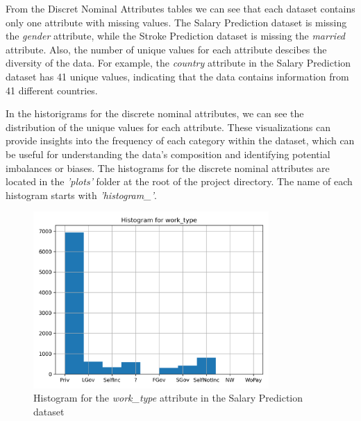 \documentclass[runningheads]{paper}
\begin{document}
From the Discret Nominal Attributes tables we can see that each dataset contains
only one attribute with missing values. The Salary Prediction dataset is missing
the \textit{gender} attribute, while the Stroke Prediction dataset is missing the
\textit{married} attribute. Also, the number of unique values for each attribute
descibes the diversity of the data. For example, the \textit{country} attribute
in the Salary Prediction dataset has 41 unique values, indicating that the data
contains information from 41 different countries.

In the historigrams for the discrete nominal attributes, we can see the
distribution of the unique values for each attribute. These visualizations can
provide insights into the frequency of each category within the dataset, which
can be useful for understanding the data's composition and identifying potential
imbalances or biases. The histograms for the discrete nominal attributes are
located in the \textit{'plots'} folder at the root of the project directory.
The name of each histogram starts with \textit{'histogram\_'}.

\begin{figure}[H]
    \centering
    \includegraphics[width=0.8\textwidth]{../plots/histogram_work_type_SalaryPrediction_full.png}
    \caption{Histogram for the \textit{work\_type} attribute in the Salary Prediction dataset}
    \label{fig:histogram_example_salary}
\end{figure}
\end{document}
